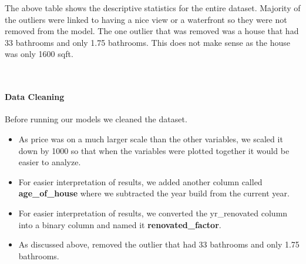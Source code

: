 \documentclass[
]{article}
\begin{document}
The above table shows the descriptive statistics for the entire dataset.
Majority of the outliers were linked to having a nice view or a
waterfront so they were not removed from the model. The one outlier that
was removed was a house that had 33 bathrooms and only 1.75 bathrooms.
This does not make sense as the house was only 1600 sqft.

~

\hypertarget{data-cleaning}{%
\paragraph{Data Cleaning}\label{data-cleaning}}

Before running our models we cleaned the dataset.

\begin{itemize}
\item
  As price was on a much larger scale than the other variables, we
  scaled it down by 1000 so that when the variables were plotted
  together it would be easier to analyze.
\item
  For easier interpretation of results, we added another column called
  \textbf{age\_of\_house} where we subtracted the year build from the
  current year.
\item
  For easier interpretation of results, we converted the yr\_renovated
  column into a binary column and named it \textbf{renovated\_factor}.
\item
  As discussed above, removed the outlier that had 33 bathrooms and only
  1.75 bathrooms.
\end{itemize}
\end{document}
